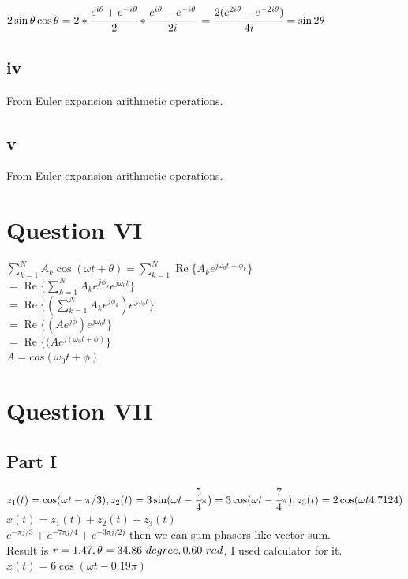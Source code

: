 \documentclass[a4paper, 12pt, titlepage]{article}
\begin{document}
\begin{center}
    $2 \sin \theta \cos \theta = 2* \cfrac{e^{i\theta}+e^{-i\theta}}{2} * \cfrac{e^{i\theta}-e^{-i\theta}}{2i} $ 
$ = \cfrac{2(e^{2i\theta} - e^{-2i\theta})}{4i} =  \sin 2 \theta $
\end{center}
\subsection{iv}
\begin{center}
From Euler expansion arithmetic operations.
\end{center}
\subsection{v}
\begin{center}
From Euler expansion arithmetic operations.
\end{center}
\section{Question VI}
\begin{center}
$ \sum_{k=1}^{N}{A_k\cos(\omega t +\theta)}  = \sum_{k=1}^{N}{ \operatorname {Re} \{ A_k e^{j\omega_0 t + \phi_k } } \} $ \\
$ = \operatorname {Re} \{ \sum_{k=1}^{N}{A_k e^{j\phi_k} e^{j\omega_0 t} } \} $ \\
$ = \operatorname {Re} \{ ( \sum_{k=1}^{N}{A_k e^{j\phi_k}  }) e^{j\omega_0 t} \} $ \\
$ = \operatorname {Re} \{ (A e^{j\phi})e^{j\omega_0 t} \} $ \\
$ = \operatorname {Re} \{ (A e^{j(\omega_0 t + \phi )} \} $ \\
$ A = cos(\omega_0 t + \phi)$
\end{center}
\section{Question VII}
\subsection{Part I}
\begin{center}
    $ z_1(t) = \cos(\omega t - \pi / 3), z_2(t) =3\sin(\omega t - \cfrac{5}{4}\pi) =
3\cos(\omega t - \cfrac{7}{4}\pi), z_3(t) = 2\cos(\omega t  4.7124)$
$x(t) = z_1(t) +z_2(t) + z_3(t) $ \\
$ e^{-\pi j/3} + e^{-7\pi j/4} +e^{-3\pi j/2j} $ then we can sum phasors like vector sum. \\ 
Result is $ r=1.47, \theta = 34.86 \text{\space} degree, 0.60 \text{\space} rad$, I used calculator for it.  \\
$ x(t) = 6\cos (\omega t - 0.19\pi)$
$ $
\end{center}
\end{document}
